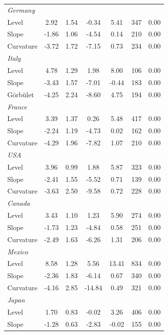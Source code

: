\documentclass[12pt,bibliography=totoc]{article}
\begin{document}
\begin{table}[H]
\begin{tabular}{l c c c c c c}
\textit{Germany}			&		&		&		&		&		&		\\
Level						&	 2.92 &	1.54	&	-0.34	&	5.41	&	347	&	0.00	\\
Slope				&	-1.86	&	1.06	&	-4.54	&	0.14	&	210	&	0.00	\\
\medskip													
Curvature					&	-3.72	&	1.72	&	-7.15	&	0.73	&	234	&	0.00	\\
\textit{Italy}			&		&		&		&		&		&		\\
Level						&	4.78	&	1.29	&	1.98	&	8.00	&	106	&	0.00	\\
Slope				&	-3.43	&	1.57	&	-7.01	&	-0.44	&	183	&	0.00	\\
\medskip													
Görbület					&	-4.25	&	2.24	&	-8.60	&	4.75	&	194	&	0.00	\\
\textit{France}			&		&		&		&		&		&		\\
Level						&	3.39	&	1.37	&	0.26	&	5.48	&	417	&	0.00	\\
Slope				&	-2.24	&	1.19	&	-4.73	&	0.02	&	162	&	0.00	\\
\medskip													
Curvature					&	-4.29	&	1.96	&	-7.82	&	1.07	&	210	&	0.00	\\
\textit{USA}				&		&		&		&		&		&		\\
Level						&	3.96	&	0.99	&	1.88	&	5.87	&	323	&	0.00	\\
Slope				&	-2.41	&	1.55	&	-5.52	&	0.71	&	139	&	0.00	\\
\medskip													
Curvature					&	-3.63	&	2.50	&	-9.58	&	0.72	&	228	&	0.00	\\
\textit{Canada}				&		&		&		&		&		&		\\
Level						&	3.43	&	1.10	&	1.23	&	5.90	&	274	&	0.00	\\
Slope				&	-1.73	&	1.23	&	-4.84	&	0.58	&	251	&	0.00	\\
\medskip													
Curvature					&	-2.49	&	1.63	&	-6.26	&	1.31	&	206	&	0.00	\\
\textit{Mexico}				&		&		&		&		&		&		\\
Level						&	8.58	&	1.28	&	5.56	&	13.41&	834	&	0.00	\\
Slope				&	-2.36	&	1.83	&	-6.14	&	0.67	&	340	&	0.00	\\
\medskip													
Curvature					&	-4.16	&	2.85&	-14.84&	0.49	&	321	&	0.00	\\
\textit{Japan}				&		&		&		&		&		&		\\
Level						&	1.70	&	0.83	&	-0.02	&	3.26	&	406	&	0.00	\\
Slope				&	-1.28	&	0.63	&	-2.83	&	-0.02	&	155	&	0.00	\\

\end{tabular}
\end{table}
\end{document}
